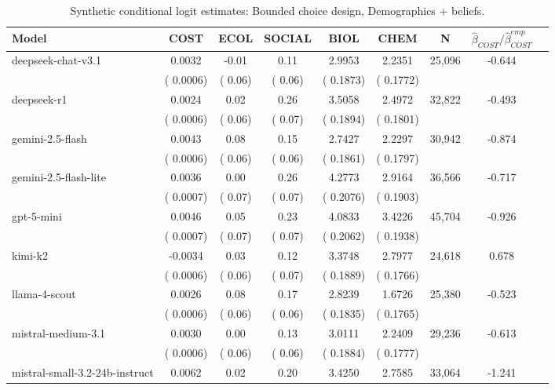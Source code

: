 \begin{table}[h]
\centering
\caption{Synthetic conditional logit estimates: Bounded choice design, Demographics + beliefs.}
\label{tab:syn-clogit-bounded-withBeliefs}
\begin{threeparttable}
\footnotesize
\begin{tabular}{lcccccccr}
\toprule
Model & COST & ECOL & SOCIAL & BIOL & CHEM & N & $\hat\beta_{COST}/\hat\beta_{COST}^{emp}$ \\
\midrule
deepseek-chat-v3.1 &    0.0032 &     -0.01 &      0.11 &    2.9953 &    2.2351 &    25,096 & -0.644 \\
 & (   0.0006) & (     0.06) & (     0.06) & (   0.1873) & (   0.1772) & & \\
deepseek-r1 &    0.0024 &      0.02 &      0.26 &    3.5058 &    2.4972 &    32,822 & -0.493 \\
 & (   0.0006) & (     0.06) & (     0.07) & (   0.1894) & (   0.1801) & & \\
gemini-2.5-flash &    0.0043 &      0.08 &      0.15 &    2.7427 &    2.2297 &    30,942 & -0.874 \\
 & (   0.0006) & (     0.06) & (     0.06) & (   0.1861) & (   0.1797) & & \\
gemini-2.5-flash-lite &    0.0036 &      0.00 &      0.26 &    4.2773 &    2.9164 &    36,566 & -0.717 \\
 & (   0.0007) & (     0.07) & (     0.07) & (   0.2076) & (   0.1903) & & \\
gpt-5-mini &    0.0046 &      0.05 &      0.23 &    4.0833 &    3.4226 &    45,704 & -0.926 \\
 & (   0.0007) & (     0.07) & (     0.07) & (   0.2062) & (   0.1938) & & \\
kimi-k2 &   -0.0034 &      0.03 &      0.12 &    3.3748 &    2.7977 &    24,618 &  0.678 \\
 & (   0.0006) & (     0.06) & (     0.07) & (   0.1889) & (   0.1766) & & \\
llama-4-scout &    0.0026 &      0.08 &      0.17 &    2.8239 &    1.6726 &    25,380 & -0.523 \\
 & (   0.0006) & (     0.06) & (     0.06) & (   0.1835) & (   0.1765) & & \\
mistral-medium-3.1 &    0.0030 &      0.00 &      0.13 &    3.0111 &    2.2409 &    29,236 & -0.613 \\
 & (   0.0006) & (     0.06) & (     0.06) & (   0.1884) & (   0.1777) & & \\
mistral-small-3.2-24b-instruct &    0.0062 &      0.02 &      0.20 &    3.4250 &    2.7585 &    33,064 & -1.241 \\

\end{tabular}
\end{threeparttable}
\end{table}
